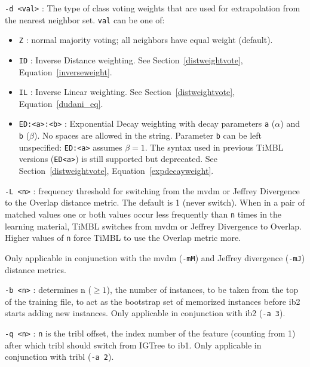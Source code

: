 \documentclass{book}
\begin{document}
\begin{description}
\item {\tt -d <val>} : The type of class voting weights that are used for
extrapolation from the nearest neighbor set. {\tt val} can be one of:
	\begin{itemize} 

  	\item {\tt Z} : normal majority voting; all neighbors have
         equal weight (default).

  	\item {\tt ID} : Inverse Distance weighting. See
  	Section~\ref{distweightvote}, Equation~\ref{inverseweight}.

  	\item {\tt IL} : Inverse Linear weighting. See
  	Section~\ref{distweightvote}, Equation~\ref{dudani_eq}.

  	\item {\tt ED:<a>:<b>} : Exponential Decay weighting with decay
  	parameters {\tt a} ($\alpha$) and {\tt b} ($\beta$). No spaces
  	are allowed in the string. Parameter {\tt b} can be left
  	unspecified: {\tt ED:<a>} assumes $\beta=1$. The syntax used
  	in previous TiMBL versions ({\tt ED<a>}) is still supported
  	but deprecated. See Section~\ref{distweightvote},
  	Equation~\ref{expdecayweight}.

\end{itemize}

\item {\tt -L <n>} : frequency threshold for switching from the {\sc
    mvdm} or Jeffrey Divergence to the Overlap distance metric. The
  default is 1 (never switch). When in a pair of matched values one or
  both values occur less frequently than {\tt n} times in the learning
  material, TiMBL switches from {\sc mvdm} or Jeffrey Divergence to
  Overlap. Higher values of {\tt n} force TiMBL to use the Overlap
  metric more. 

 Only applicable in conjunction with the {\sc mvdm}
  ({\tt -mM}) and Jeffrey divergence ({\tt -mJ}) distance metrics.


\item {\tt -b <n>} : determines n ($\geq 1$), the number of instances,
to be taken from the top of the training file, to act as the bootstrap
set of memorized instances before {\sc ib2} starts adding new
instances. Only applicable in conjunction with {\sc ib2} ({\tt -a 3}).

\item {\tt -q <n>} : {\tt n} is the {\sc tribl} offset, the index
number of the feature (counting from 1) after which {\sc tribl} should
switch from {\sc IGTree} to {\sc ib1}. Only applicable in conjunction
with {\sc tribl} ({\tt -a 2}).


\end{description}
\end{document}
